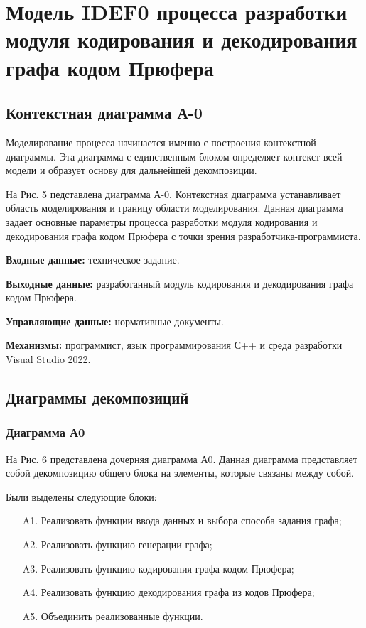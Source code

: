 \documentclass[a4paper, final]{article}
\begin{document}
\newpage
\section{Модель IDEF0 процесса разработки модуля кодирования и декодирования графа кодом Прюфера}
\subsection{Контекстная диаграмма А-0}

Моделирование процесса начинается именно с построения контекстной диаграммы. Эта диаграмма с единственным блоком определяет
контекст всей модели и образует основу для дальнейшей декомпозиции. 
\par На Рис. 5 педставлена диаграмма А-0. Контекстная диаграмма устанавливает область моделирования и границу 
области моделирования. Данная диаграмма задает основные параметры процесса разработки модуля кодирования и декодирования графа
кодом Прюфера с точки зрения разработчика-программиста. 

\par {\bf Входные данные:} техническое задание.

\par {\bf Выходные данные:} разработанный модуль кодирования и декодирования графа кодом Прюфера.

\par {\bf Управляющие данные:} нормативные документы.

\par {\bf Механизмы:} программист, язык программирования С++ и среда разработки Visual Studio 2022. 

\newpage
\hypertarget{img:A-0}{}



\subsection{Диаграммы декомпозиций}
\subsubsection{Диаграмма А0}

На Рис. 6 представлена дочерняя диаграмма А0. Данная диаграмма представляет собой декомпозицию общего блока на 
элементы, которые связаны между собой.

Были выделены следующие блоки:

\begin{itemize}
	\item[A1.] Реализовать функции ввода данных и выбора способа задания графа;
	\item[A2.] Реализовать функцию генерации графа;
	\item[A3.] Реализовать функцию кодирования графа кодом Прюфера;
	\item[A4.] Реализовать функцию декодирования графа из кодов Прюфера;
	\item[A5.] Объединить реализованные функции.
\end{itemize} 
\end{document}

